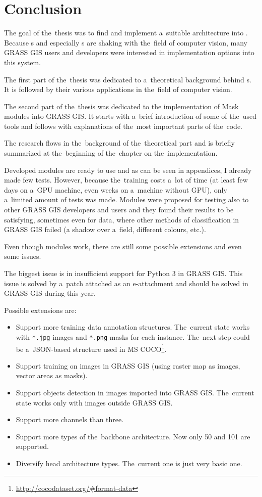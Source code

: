 \chapter{Conclusion}
\label{conclusion}

The goal of the~thesis was to find and implement a~suitable  
architecture into  . Because s and especially 
s are shaking with the~field of computer vision, many GRASS GIS users 
and developers were interested in implementation options into this system.

The first part of the~thesis was dedicated to a~theoretical background behind 
s. It is followed by their various applications in the~field of computer 
vision. 

The second part of the~thesis was dedicated to the implementation of Mask  
modules into GRASS GIS. It starts with a~brief introduction of some of the~used 
tools and follows with explanations of the~most important parts of the~code.

The research flows in the~background of the~theoretical part and is briefly 
summarized at the~beginning of the~chapter on the~implementation.

Developed modules are ready to use and as can be seen in appendices, I already 
made few tests. However, because the~training costs a~lot of time (at least few 
days on a~GPU machine, even weeks on a~machine without GPU), only a~limited 
amount of tests was made. Modules were proposed for testing also to other GRASS 
GIS developers and users and they found their results to be satisfying, 
sometimes even for data, where other methods of classification in GRASS GIS 
failed (a shadow over a~field, different colours, etc.).

Even though modules work, there are still some possible extensions and even some 
issues.

The biggest issue is in insufficient support for Python 3 in GRASS GIS. This 
issue is solved by a~patch attached as an e-attachment and should be solved in 
GRASS GIS during this year.

Possible extensions are:
\begin{itemize}
	\item Support more training data annotation structures. The~current state works with \verb|*.jpg| images and \verb|*.png| masks for each instance. The~next step could be a~JSON-based structure used in MS COCO\footnote{\url{http://cocodataset.org/\#format-data}}.
	\item Support training on images in GRASS GIS (using raster map as images, vector areas as masks).
	\item Support objects detection in images imported into GRASS GIS. The~current state works only with images outside GRASS GIS.
	\item Support more channels than three.
	\item Support more types of the~backbone architecture. Now only  50 and  101 are supported.
	\item Diversify head architecture types. The~current one is just very basic one.
\end{itemize}

